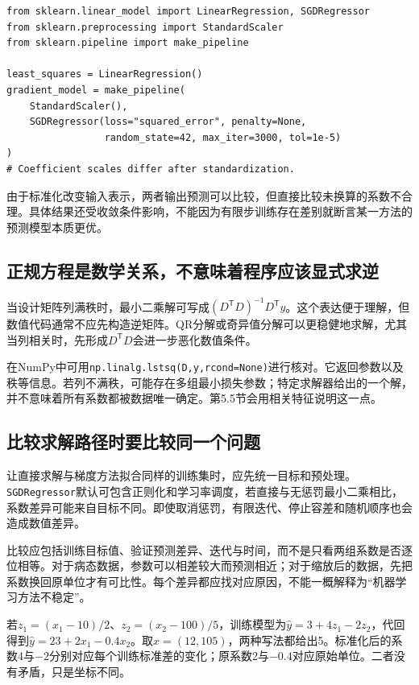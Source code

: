 \begin{lstlisting}[caption={最小二乘与无惩罚随机梯度方法的概念对照}]
from sklearn.linear_model import LinearRegression, SGDRegressor
from sklearn.preprocessing import StandardScaler
from sklearn.pipeline import make_pipeline

least_squares = LinearRegression()
gradient_model = make_pipeline(
    StandardScaler(),
    SGDRegressor(loss="squared_error", penalty=None,
                 random_state=42, max_iter=3000, tol=1e-5)
)
# Coefficient scales differ after standardization.
\end{lstlisting}

由于标准化改变输入表示，两者输出预测可以比较，但直接比较未换算的系数不合理。具体结果还受收敛条件影响，不能因为有限步训练存在差别就断言某一方法的预测模型本质更优。

\subsection{正规方程是数学关系，不意味着程序应该显式求逆}
当设计矩阵列满秩时，最小二乘解可写成$(D^{\mathsf T}D)^{-1}D^{\mathsf T}y$。这个表达便于理解，但数值代码通常不应先构造逆矩阵。QR分解或奇异值分解可以更稳健地求解，尤其当列相关时，先形成$D^{\mathsf T}D$会进一步恶化数值条件。

在NumPy中可用\texttt{np.linalg.lstsq(D,y,rcond=None)}进行核对。它返回参数以及秩等信息。若列不满秩，可能存在多组最小损失参数；特定求解器给出的一个解，并不意味着所有系数都被数据唯一确定。第5.5节会用相关特征说明这一点。

\subsection{比较求解路径时要比较同一个问题}
让直接求解与梯度方法拟合同样的训练集时，应先统一目标和预处理。\texttt{SGDRegressor}默认可包含正则化和学习率调度，若直接与无惩罚最小二乘相比，系数差异可能来自目标不同。即使取消惩罚，有限迭代、停止容差和随机顺序也会造成数值差异。

比较应包括训练目标值、验证预测差异、迭代与时间，而不是只看两组系数是否逐位相等。对于病态数据，参数可以相差较大而预测相近；对于缩放后的数据，先把系数换回原单位才有可比性。每个差异都应找对应原因，不能一概解释为“机器学习方法不稳定”。

若$z_1=(x_1-10)/2$、$z_2=(x_2-100)/5$，训练模型为$\hat y=3+4z_1-2z_2$，代回得到$\hat y=23+2x_1-0.4x_2$。取$x=(12,105)$，两种写法都给出5。标准化后的系数4与$-2$分别对应每个训练标准差的变化；原系数2与$-0.4$对应原始单位。二者没有矛盾，只是坐标不同。

